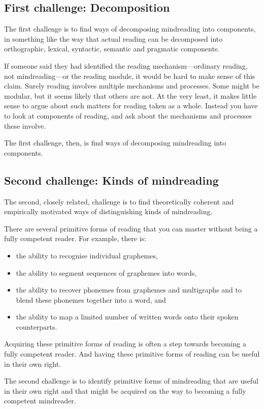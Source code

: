\documentclass[12pt,\papersize]{extarticle}
\begin{document}
\subsection{First challenge: Decomposition}
The first challenge is to find ways of decomposing mindreading into components, in something like the way that actual reading can be decomposed into orthographic, lexical, syntactic, semantic and pragmatic components.

If someone said they had identified the reading mechanism---ordinary reading, not mindreading---or the reading module, it would be hard to make sense of this claim.  
Surely reading involves multiple mechanisms and processes.
Some might be modular, but it seems likely that others are not.
At the very least, it makes little sense to argue about such matters for reading taken as a whole.
Instead you have to look at components of reading, and ask about the mechanisms and processes these involve.

The first challenge, then, is find ways of decomposing mindreading into components.



\subsection{Second challenge: Kinds of mindreading}
The second, closely related, challenge is to find theoretically coherent and empirically motivated ways of distinguishing kinds of mindreading.

There are several primitive forms of reading that you can master without being a fully competent reader.
For example, there is:
% 
\begin{itemize}
	\item	the ability to recognise individual graphemes,
	\item the ability to segment sequences of graphemes into  words,
	\item	the ability to recover phonemes from graphemes and multigraphs and to blend these phonemes together into a word, 
	and
	\item the ability to map  a limited number of written words onto their spoken counterparts.
\end{itemize}
%	
Acquiring these primitive forms of reading is often a step towards becoming a fully competent reader.
And having these primitive forms of reading can be useful in their own right. 

The second challenge is to identify primitive forms of mindreading that are useful in their own right and that might be acquired on the way to becoming a fully competent mindreader.
\end{document}
